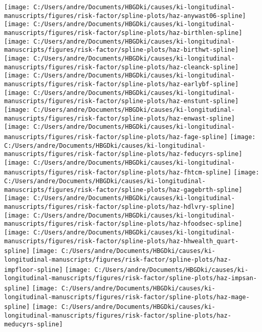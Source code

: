 \documentclass[
  9pt,
]{book}
\begin{document}
\texttt{[image: C:/Users/andre/Documents/HBGDki/causes/ki-longitudinal-manuscripts/figures/risk-factor/spline-plots/haz-anywast06-spline]}
\texttt{[image: C:/Users/andre/Documents/HBGDki/causes/ki-longitudinal-manuscripts/figures/risk-factor/spline-plots/haz-birthlen-spline]}
\texttt{[image: C:/Users/andre/Documents/HBGDki/causes/ki-longitudinal-manuscripts/figures/risk-factor/spline-plots/haz-birthwt-spline]}
\texttt{[image: C:/Users/andre/Documents/HBGDki/causes/ki-longitudinal-manuscripts/figures/risk-factor/spline-plots/haz-cleanck-spline]}
\texttt{[image: C:/Users/andre/Documents/HBGDki/causes/ki-longitudinal-manuscripts/figures/risk-factor/spline-plots/haz-earlybf-spline]}
\texttt{[image: C:/Users/andre/Documents/HBGDki/causes/ki-longitudinal-manuscripts/figures/risk-factor/spline-plots/haz-enstunt-spline]}
\texttt{[image: C:/Users/andre/Documents/HBGDki/causes/ki-longitudinal-manuscripts/figures/risk-factor/spline-plots/haz-enwast-spline]}
\texttt{[image: C:/Users/andre/Documents/HBGDki/causes/ki-longitudinal-manuscripts/figures/risk-factor/spline-plots/haz-fage-spline]}
\texttt{[image: C:/Users/andre/Documents/HBGDki/causes/ki-longitudinal-manuscripts/figures/risk-factor/spline-plots/haz-feducyrs-spline]}
\texttt{[image: C:/Users/andre/Documents/HBGDki/causes/ki-longitudinal-manuscripts/figures/risk-factor/spline-plots/haz-fhtcm-spline]}
\texttt{[image: C:/Users/andre/Documents/HBGDki/causes/ki-longitudinal-manuscripts/figures/risk-factor/spline-plots/haz-gagebrth-spline]}
\texttt{[image: C:/Users/andre/Documents/HBGDki/causes/ki-longitudinal-manuscripts/figures/risk-factor/spline-plots/haz-hdlvry-spline]}
\texttt{[image: C:/Users/andre/Documents/HBGDki/causes/ki-longitudinal-manuscripts/figures/risk-factor/spline-plots/haz-hfoodsec-spline]}
\texttt{[image: C:/Users/andre/Documents/HBGDki/causes/ki-longitudinal-manuscripts/figures/risk-factor/spline-plots/haz-hhwealth\_quart-spline]}
\texttt{[image: C:/Users/andre/Documents/HBGDki/causes/ki-longitudinal-manuscripts/figures/risk-factor/spline-plots/haz-impfloor-spline]}
\texttt{[image: C:/Users/andre/Documents/HBGDki/causes/ki-longitudinal-manuscripts/figures/risk-factor/spline-plots/haz-impsan-spline]}
\texttt{[image: C:/Users/andre/Documents/HBGDki/causes/ki-longitudinal-manuscripts/figures/risk-factor/spline-plots/haz-mage-spline]}
\texttt{[image: C:/Users/andre/Documents/HBGDki/causes/ki-longitudinal-manuscripts/figures/risk-factor/spline-plots/haz-meducyrs-spline]}
\end{document}
